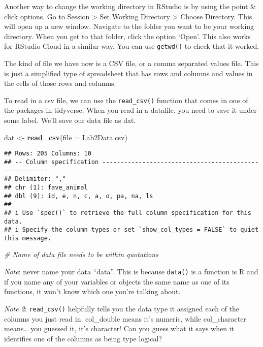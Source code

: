 \documentclass[
]{article}
\newenvironment{Shaded}{\begin{snugshade}}{\end{snugshade}}
\newcommand{\AttributeTok}[1]{\textcolor[rgb]{0.13,0.29,0.53}{#1}}
\newcommand{\CommentTok}[1]{\textcolor[rgb]{0.56,0.35,0.01}{\textit{#1}}}
\newcommand{\FunctionTok}[1]{\textcolor[rgb]{0.13,0.29,0.53}{\textbf{#1}}}
\newcommand{\NormalTok}[1]{#1}
\newcommand{\OtherTok}[1]{\textcolor[rgb]{0.56,0.35,0.01}{#1}}
\newcommand{\StringTok}[1]{\textcolor[rgb]{0.31,0.60,0.02}{#1}}
\begin{document}
Another way to change the working directory in RStudio is by using the
point \& click options. Go to Session \textgreater{} Set Working
Directory \textgreater{} Choose Directory. This will open up a new
window. Navigate to the folder you want to be your working directory.
When you get to that folder, click the option `Open'. This also works
for RStudio Cloud in a similar way. You can use \texttt{getwd()} to
check that it worked.

The kind of file we have now is a CSV file, or a comma separated values
file. This is just a simplified type of spreadsheet that has rows and
columns and values in the cells of those rows and columns.

To read in a csv file, we can use the \texttt{read\_csv()} function that
comes in one of the packages in tidyverse. When you read in a datafile,
you need to save it under some label. We'll save our data file as dat.

\begin{Shaded}
\begin{Highlighting}[]
\NormalTok{dat }\OtherTok{\textless{}{-}} \FunctionTok{read\_csv}\NormalTok{(}\AttributeTok{file =} \StringTok{\textquotesingle{}Lab2Data.csv\textquotesingle{}}\NormalTok{)}
\end{Highlighting}
\end{Shaded}

\begin{verbatim}
## Rows: 205 Columns: 10
## -- Column specification --------------------------------------------------------
## Delimiter: ","
## chr (1): fave_animal
## dbl (9): id, e, n, c, a, o, pa, na, ls
## 
## i Use `spec()` to retrieve the full column specification for this data.
## i Specify the column types or set `show_col_types = FALSE` to quiet this message.
\end{verbatim}

\begin{Shaded}
\begin{Highlighting}[]
  \CommentTok{\# Name of data file needs to be within quotations}
\end{Highlighting}
\end{Shaded}

\emph{Note}: never name your data ``data''. This is because
\texttt{data()} is a function is R and if you name any of your variables
or objects the same name as one of its functions, it won't know which
one you're talking about.

\emph{Note 2}: \texttt{read\_csv()} helpfully tells you the data type it
assigned each of the columns you just read in. col\_double means it's
numeric, while col\_character means\ldots{} you guessed it, it's
character! Can you guess what it says when it identifies one of the
columns as being type logical?
\end{document}
